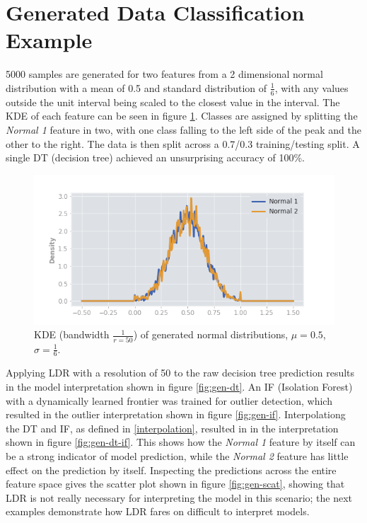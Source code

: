 \documentclass[a4paper, oneside, twocolumn]{article}
\begin{document}
\section{Generated Data Classification Example}

5000 samples are generated for two features from a 2 dimensional normal distribution with a mean of 0.5 and standard distribution of $\frac{1}{6}$, with any values outside the unit interval being scaled to the closest value in the interval. The KDE of each feature can be seen in figure \ref{fig:gen-kde}. Classes are assigned by splitting the \textit{Normal 1} feature in two, with one class falling to the left side of the peak and the other to the right. The data is then split across a 0.7/0.3 training/testing split. A single DT (decision tree) achieved an unsurprising accuracy of 100\%. 

\begin{figure}
\centering
\includegraphics[width=0.8\columnwidth]{img/gen_kde.png}
\caption{KDE (bandwidth $\frac{1}{r = 50}$) of generated normal distributions, $\mu = 0.5$, $\sigma = \frac{1}{6}$.}
\label{fig:gen-kde}
\end{figure}

Applying LDR with a resolution of 50 to the raw decision tree prediction results in the model interpretation shown in figure \ref{fig:gen-dt}. An IF (Isolation Forest) \cite{liu2008isolation} with a dynamically learned frontier was trained for outlier detection, which resulted in the outlier interpretation shown in figure \ref{fig:gen-if}. Interpolationg the DT and IF, as defined in \ref{interpolation}, resulted in in the interpretation shown in figure \ref{fig:gen-dt-if}. This shows how the \textit{Normal 1} feature by itself can be a strong indicator of model prediction, while the \textit{Normal 2} feature has little effect on the prediction by itself. Inspecting the predictions across the entire feature space gives the scatter plot shown in figure \ref{fig:gen-scat}, showing that LDR is not really necessary for interpreting the model in this scenario; the next examples demonstrate how LDR fares on difficult to interpret models.
\end{document}
